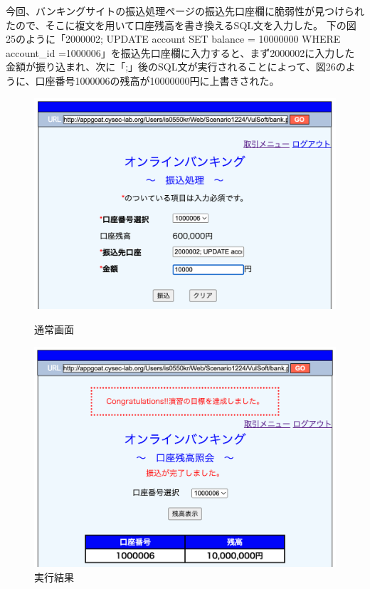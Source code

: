 \documentclass[dvipdfmx,autodetect-engine,titlepage]{jsarticle}
\begin{document}
今回、バンキングサイトの振込処理ページの振込先口座欄に脆弱性が見つけられたので、そこに複文を用いて口座残高を書き換えるSQL文を入力した。
下の図25のように「2000002; UPDATE account SET balance = 10000000 WHERE account\_id =1000006」を振込先口座欄に入力すると、まず2000002に入力した金額が振り込まれ、次に「;」後のSQL文が実行されることによって、図26のように、口座番号1000006の残高が10000000円に上書きされた。\\

\begin{figure}[H]
  \centering
  \begin{minipage}[b]{0.45\linewidth}
  \begin{center}
    \includegraphics[keepaspectratio,scale=0.3]{sql9.png}
    \end{center}
    \caption{通常画面}
  \end{minipage}
  \begin{minipage}[b]{0.45\linewidth}
  \begin{center}
    \includegraphics[keepaspectratio,scale=0.3]{sql10.png}
    \end{center}
    \caption{実行結果}
  \end{minipage}
\end{figure}
　
\end{document}
